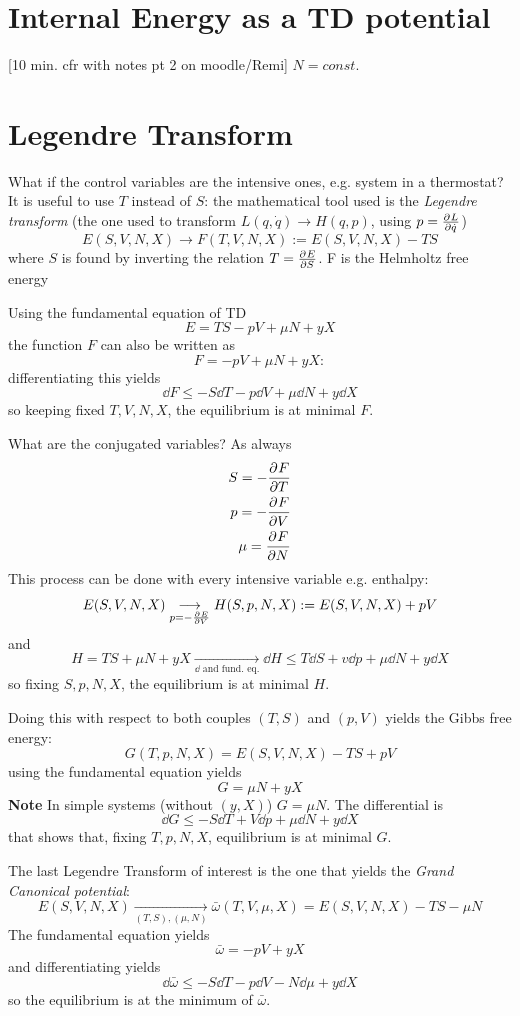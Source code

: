 
\section{Internal Energy as a TD potential}
[10 min. cfr with notes pt 2 on moodle/Remi]
$N = const.$
\section{Legendre Transform}
What if the control variables are the intensive ones, e.g. system in a thermostat? It
is useful to use $T$ instead of $S$: the mathematical tool used is the \textit{Legendre
transform} (the one used to transform $L(q,\dot q)\rightarrow H(q,p)$, using 
$p = \pdv[]{L}{\dot q}$)
$$E(S,V,N,X)\rightarrow F(T,V,N,X):=E\left(S,V,N,X\right)-TS$$
where $S$ is found by inverting the relation $T=\pdv[]{E}{S}$. F is the Helmholtz
free energy

Using the fundamental equation of TD
$$E=TS-pV+\mu N+yX$$
the function $F$ can also be written as
$$F = -pV +\mu N +yX:$$
differentiating this yields
$$\dd F \leq -S\dd T-p\dd V + \mu \dd N + y\dd X$$
so keeping fixed $T,V,N,X$, the equilibrium is at minimal $F$.

What are the conjugated variables? As always
\begin{align*}
S = -\pdv[]{F}{T}\\
p = - \pdv[]{F}{V}\\
\mu = \pdv[]{F}{N}
\end{align*}
This process can be done with every intensive variable e.g. enthalpy:
$$E(S,V,N,X)\underset{p = -\pdv[]{E}{V}}\longrightarrow H(S,p,N,X) := E(S,V,N,X) +pV$$
and
$$H=TS+\mu N+yX \underset{\dd\text{ and fund. eq.}}\longrightarrow 
\dd H \leq T\dd S + v \dd p +\mu \dd N +y\dd X$$
so fixing $S,p,N,X$, the equilibrium is at minimal $H$.

Doing this with respect to both couples $(T,S)$ and $(p,V)$ yields the Gibbs free
energy:
$$G(T,p,N,X) = E(S,V,N,X) - TS + pV$$
using the fundamental equation yields
$$G = \mu N + yX$$
\textbf{Note} In simple systems (without $(y,X)$) $G=\mu N$. The differential is
$$\dd G\leq -S\dd T + V\dd p +\mu \dd N +y\dd X$$
that shows that, fixing $T,p,N,X$, equilibrium is at minimal $G$.

The last Legendre Transform of interest is the one that yields the \textit{Grand
Canonical potential}:
$$E(S,V,N,X)\underset{(T,S),(\mu,N)}\longrightarrow \bar\omega(T,V,\mu,X) = E(S,V,N,X)-
TS-\mu N$$
The fundamental equation yields
$$\bar\omega = -pV+yX$$
and differentiating yields
$$\dd \bar\omega\leq -S\dd T -p\dd V -N\dd\mu+y\dd X$$
so the equilibrium is at the minimum of $\bar\omega$.

